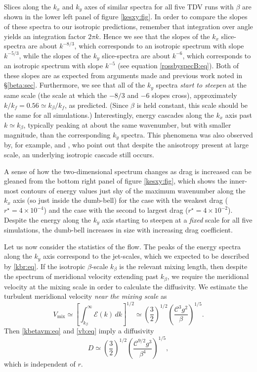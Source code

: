 \documentclass{jfm}
\newcommand{\ca}  [1]{\mathcal{#1}}
\begin{document}
Slices along the $k_x$ and $k_y$ axes of similar spectra for all five
TDV runs with $\beta$ are shown in the lower left panel of figure
\ref{kesxy:fig}. In order to compare the slopes of these spectra to
our isotropic predictions, remember that integration over angle yields
an integration factor $2\pi k$.  Hence we see that the slopes of the
$k_x$ slice-spectra are about $k^{-8/3}$, which corresponds to an
isotropic spectrum with slope $k^{-5/3}$, while the slopes of the
$k_y$ slice-spectra are about $k^{-6}$, which corresponds to an
isotropic spectrum with slope $k^{-5}$ (see equation
\ref{rossbyspecB:eq}). Both of these slopes are as expected from
arguments made and previous work noted in \S \ref{beta:sec}.
Furthermore, we see that all of the $k_y$ spectra \textit{start to
steepen} at the same scale (the scale at which the $-8/3$ and $-6$
slopes cross), approximately $k/k_f = 0.56 \simeq k_{\beta}/k_f$, as
predicted. (Since $\beta$ is held constant, this scale should be the
same for all simulations.) Interestingly, energy cascades along the
$k_x$ axis past $k\simeq k_{\beta}$, typically peaking at about the
same wavenumber, but with smaller magnitude, than the corresponding
$k_y$ spectra.  This phenomena was also observed by, for example,
\citet{chekhlov96} and \citet{smithwaleffe99}, who point out that
despite the anisotropy present at large scale, an underlying isotropic
cascade still occurs.

A sense of how the two-dimensional spectrum changes as drag is increased
can be gleaned from the bottom right panel of figure \ref{kesxy:fig}, which
shows the inner-most contours of energy values just shy of the maximum
wavenumber along the $k_x$ axis (so just inside the dumb-bell) for the case
with the weakest drag ($r^{\star} = 4\times 10^{-4}$) and the case with the
second to largest drag ($r^{\star} = 4\times 10^{-2}$).  Despite the energy
along the $k_y$ axis starting to steepen at a \textit{fixed} scale for all
five simulations, the dumb-bell increases in size with increasing drag
coefficient.

Let us now consider the statistics of the flow.  The peaks of the energy
spectra along the $k_y$ axis correspond to the jet-scales, which we
expected to be described by \eqref{kbr:eq}.  If the isotropic $\beta$-scale
$k_{\beta}$ is the relevant mixing length, then despite the spectrum of
meridional velocity extending past $k_{\beta}$, we require the meridional
velocity at the mixing scale in order to calculate the diffusivity.  We
estimate the turbulent meridional velocity \textit{near the mixing scale}
as
\begin{equation}
V_{\mathrm{mix}} \simeq \left[\int_{k_{\beta}}^{\infty}\ca{E}(k) \, dk
\right]^{1/2}
\simeq \left(\frac{3}{2}\right)^{1/2}
\left(\frac{\ca{C}^3g^2}{\beta}\right)^{1/5}.
\label{vb:eq}
\end{equation}
Then \eqref{kbetavm:eq} and \eqref{vb:eq} imply a diffusivity
\begin{equation}
D\simeq
\left(\frac{3}{2}\right)^{1/2}
\left(\frac{\ca{C}^{9/2}g^3}{\beta^4}\right)^{1/5},
\label{Dbeta:eq}
\end{equation}
which is independent of $r$.
\end{document}
